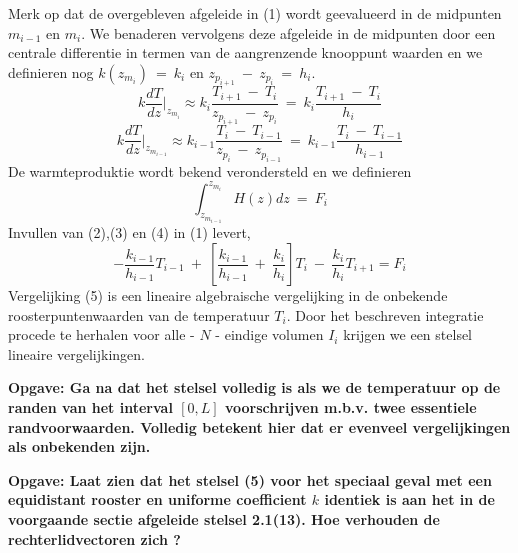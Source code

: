 Merk op dat de overgebleven afgeleide in (1) wordt geevalueerd in de
midpunten $m_{i-1}$ en $m_i$.
We benaderen vervolgens deze afgeleide in de midpunten door een 
centrale differentie in termen van de aangrenzende knooppunt waarden
en we definieren nog $k(z_{m_i}) \ =\ k_i$ en 
$z_{p_{i+1}}\ -\ z_{p_{i}}\ =\ h_i$.
\begin{equation}
k \frac {dT} {dz} |_{z_{m_i}}
\approx
k_i \frac { T_{i+1}     \ -\ T_i     }
          { z_{p_{i+1}} \ -\ z_{p_i} }
\ = \
k_i \frac { T_{i+1} \ -\ T_i} {h_i}
\end{equation}
\begin{equation}
k \frac {dT} {dz} |_{z_{m_{i-1}} }
\approx
k_{i-1} \frac { T_i     \ -\ T_{i-1}     } 
              { z_{p_i} \ -\ z_{p_{i-1}} }
\ = \
k_{i-1} \frac { T_i \ -\ T_{i-1}} {h_{i-1}}
\end{equation}
De warmteproduktie wordt bekend verondersteld en we definieren
\begin{equation}
\int_{z_{m_{i-1}}} ^{z_{m_i}} H(z) dz \ =\ F_i
\end{equation}
Invullen van (2),(3) en (4) in (1) levert,
\begin{equation}
- \frac {k_{i-1}} {h_{i-1}} T_{i-1}
\ +\ 
\left [
      \frac{k_{i-1}} {h_{i-1}}
      \ +\ 
      \frac{k_{i}} {h_{i}}
\right ]
T_i
\ -\ 
\frac{k_{i}}{h_{i}} T_{i+1}
= F_i
\end{equation}
Vergelijking (5) is een lineaire algebraische vergelijking in de 
onbekende roosterpuntenwaarden van de temperatuur $T_i$.
Door het beschreven integratie procede te herhalen voor alle 
- $N$ -
eindige volumen $I_i$ krijgen we een stelsel lineaire vergelijkingen.

\vspace{0.5cm}
\noindent
\bf Opgave:\rm
\newline
\small
Ga na dat het stelsel volledig is als we de temperatuur op de randen
van het interval $[0,L]$ voorschrijven m.b.v. twee essentiele 
randvoorwaarden.
Volledig betekent hier dat er evenveel vergelijkingen als onbekenden
zijn.
\normalsize
\vspace{0.5cm}

\vspace{0.5cm}
\noindent
\bf Opgave:\rm
\newline
\small
Laat zien dat het stelsel (5) voor het speciaal geval met een 
equidistant rooster en uniforme coefficient $k$ identiek is aan het
in de voorgaande sectie afgeleide stelsel 2.1(13).
Hoe verhouden de rechterlidvectoren zich ?
\normalsize
\vspace{0.5cm}

